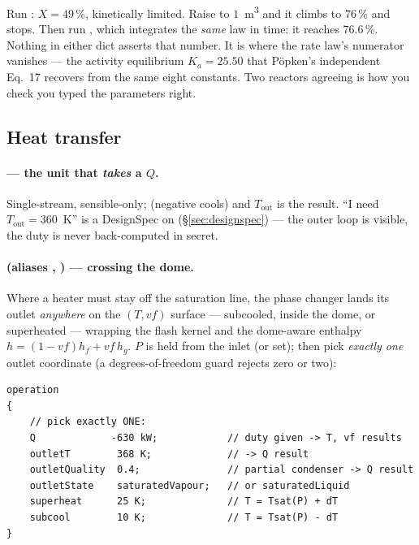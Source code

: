 \documentclass[11pt,a4paper]{article}
\begin{document}
\begin{tryit}
Run : $X = 49\,\%$, kinetically
limited.  Raise  to $1$~m\textsuperscript{3} and it climbs
to $76\,\%$ and stops.  Then run ,
which integrates the \emph{same} law in time: it reaches $76.6\,\%$.
Nothing in either dict asserts that number.  It is where the rate law's
numerator vanishes --- the activity equilibrium $K_a = 25.50$ that
P\"opken's independent Eq.~17 recovers from the same eight constants.
Two reactors agreeing is how you check you typed the parameters right.
\end{tryit}

\subsection{Heat transfer}\label{sec:heat-family}

\paragraph{ --- the unit that \emph{takes} a $Q$.}
Single-stream, sensible-only;  (negative
cools) and $T_{\mathrm{out}}$ is the result.  ``I need
$T_{\mathrm{out}} = 360$~K'' is a DesignSpec on 
(\S\ref{sec:designspec}) --- the outer loop is visible, the duty is
never back-computed in secret.

\paragraph{ (aliases , )
--- crossing the dome.}  Where a heater must stay off the saturation
line, the phase changer lands its outlet \emph{anywhere} on the
$(T, vf)$ surface --- subcooled, inside the dome, or superheated ---
wrapping the flash kernel and the dome-aware enthalpy
$h = (1-vf)h_f + vf\,h_g$.  $P$ is held from the inlet (or set); then
pick \emph{exactly one} outlet coordinate (a degrees-of-freedom guard
rejects zero or two):

\begin{lstlisting}[language=dict]
operation
{
    // pick exactly ONE:
    Q             -630 kW;            // duty given -> T, vf results
    outletT        368 K;             // -> Q result
    outletQuality  0.4;               // partial condenser -> Q result
    outletState    saturatedVapour;   // or saturatedLiquid
    superheat      25 K;              // T = Tsat(P) + dT
    subcool        10 K;              // T = Tsat(P) - dT
}
\end{lstlisting}
\end{document}
